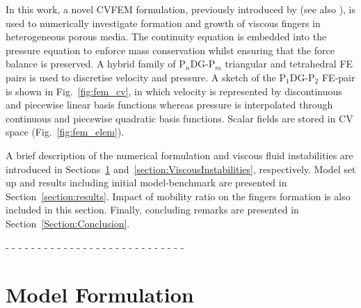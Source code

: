 \documentclass[preprint,authoryear,12pt]{elsarticle}
\newcommand{\blue}{\textcolor{blue}}
\newcommand{\PN}[2][error]{P$_{#1}$DG-P$_{#2}$}
\begin{document}
\medskip 
In this work, a novel CVFEM formulation, previously introduced by \citet{gomes_2017} (see also \citet{jackson_2015,salinas2015}), is used to numerically investigate formation and growth of viscous fingers in heterogeneous porous media. The continuity equation is embedded into the pressure equation to enforce mass conservation whilst ensuring that the force balance is preserved. A hybrid family of \PN[n]{m} triangular and tetrahedral FE pairs is used to discretise velocity and pressure. A sketch of the \PN[1]{2} FE-pair is shown in Fig.~\ref{fig:fem_cv}, in which velocity is represented by discontinuous and piecewise linear basis functions whereas pressure is interpolated through continuous and piecewise quadratic basis functions. Scalar fields are stored in CV space (Fig.~\ref{fig:fem_elem}). 
 
\medskip
A brief description of the numerical formulation and viscous fluid instabilities are introduced in Sections~\ref{equations_scheme} and~\ref{section:ViscousInstabilities}, respectively. Model set up and results including initial model-benchmark are presented in Section~\ref{section:results}. Impact of mobility ratio on the fingers formation is also included in this section. Finally, concluding remarks are presented in Section~\ref{Section:Conclusion}.  

\medskip
\blue{- - - - - - - - - - - - - - - - - - - - - - - - - - - -}


\section{Model Formulation}\label{equations_scheme}      
\end{document}
